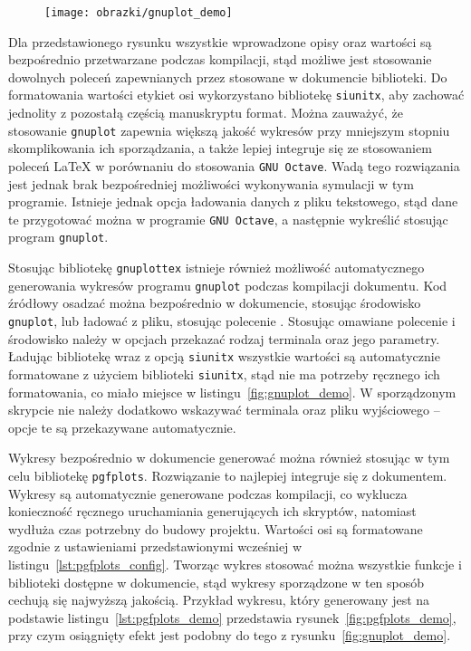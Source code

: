 \begin{listing}[hbt]
\inputminted{gnuplot}{skrypty/gnuplot_demo.gnuplot}
\end{listing}

\begin{figure}[!htb]
\texttt{[image: obrazki/gnuplot\_demo]}
\end{figure}

Dla przedstawionego rysunku wszystkie wprowadzone opisy oraz wartości są bezpośrednio przetwarzane podczas kompilacji, stąd możliwe jest stosowanie dowolnych poleceń zapewnianych przez stosowane w dokumencie biblioteki. Do formatowania wartości etykiet osi wykorzystano bibliotekę \texttt{siunitx}, aby zachować jednolity z pozostałą częścią manuskryptu format. Można zauważyć, że stosowanie \texttt{gnuplot} zapewnia większą jakość wykresów przy mniejszym stopniu skomplikowania ich sporządzania, a także lepiej integruje się ze stosowaniem poleceń \LaTeX{} w porównaniu do stosowania \texttt{GNU Octave}. Wadą tego rozwiązania jest jednak brak bezpośredniej możliwości wykonywania symulacji w tym programie. Istnieje jednak opcja ładowania danych z pliku tekstowego, stąd dane te przygotować można w programie \texttt{GNU Octave}, a następnie wykreślić stosując program \texttt{gnuplot}.

Stosując bibliotekę \texttt{gnuplottex} istnieje również możliwość automatycznego generowania wykresów programu \texttt{gnuplot} podczas kompilacji dokumentu. Kod źródłowy osadzać można bezpośrednio w dokumencie, stosując środowisko \texttt{gnuplot}, lub ładować z pliku, stosując polecenie \texttt{}. Stosując omawiane polecenie i środowisko należy w opcjach przekazać rodzaj terminala oraz jego parametry. Ładując bibliotekę wraz z opcją \texttt{siunitx} wszystkie wartości są automatycznie formatowane z użyciem biblioteki \texttt{siunitx}, stąd nie ma potrzeby ręcznego ich formatowania, co miało miejsce w listingu~\ref{fig:gnuplot_demo}. W sporządzonym skrypcie nie należy dodatkowo wskazywać terminala oraz pliku wyjściowego -- opcje te są przekazywane automatycznie.

Wykresy bezpośrednio w dokumencie generować można również stosując w tym celu bibliotekę \texttt{pgfplots}. Rozwiązanie to najlepiej integruje się z dokumentem. Wykresy są automatycznie generowane podczas kompilacji, co wyklucza konieczność ręcznego uruchamiania generujących ich skryptów, natomiast wydłuża czas potrzebny do budowy projektu. Wartości osi są formatowane zgodnie z ustawieniami przedstawionymi wcześniej w listingu~\ref{lst:pgfplots_config}. Tworząc wykres stosować można wszystkie funkcje i biblioteki dostępne w dokumencie, stąd wykresy sporządzone w ten sposób cechują się najwyższą jakością. Przykład wykresu, który generowany jest na podstawie listingu~\ref{lst:pgfplots_demo} przedstawia rysunek~\ref{fig:pgfplots_demo}, przy czym osiągnięty efekt jest podobny do tego z rysunku~\ref{fig:gnuplot_demo}.

